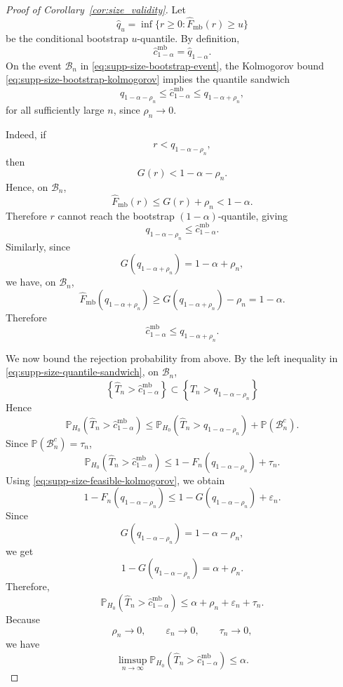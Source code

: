 \documentclass[
  12pt]{article}
\theoremstyle{plain}
\theoremstyle{definition}
\theoremstyle{remark}
\begin{document}
\begin{proof}[Proof of Corollary~\ref{cor:size_validity}]
Let
\[
\widehat q_u
=
\inf\{r\ge0:\widehat F_{\mathrm{mb}}(r)\ge u\}
\]
be the conditional bootstrap \(u\)-quantile. By definition,
\[
\widehat c_{1-\alpha}^{\mathrm{mb}}
=
\widehat q_{1-\alpha}.
\]
On the event \(\mathcal B_n\) in \eqref{eq:supp-size-bootstrap-event}, the
Kolmogorov bound \eqref{eq:supp-size-bootstrap-kolmogorov} implies the
quantile sandwich
\begin{equation}
\label{eq:supp-size-quantile-sandwich}
q_{1-\alpha-\rho_n}
\le
\widehat c_{1-\alpha}^{\mathrm{mb}}
\le
q_{1-\alpha+\rho_n},
\end{equation}
for all sufficiently large \(n\), since \(\rho_n\to0\).

Indeed, if
\[
r<q_{1-\alpha-\rho_n},
\]
then
\[
G(r)<1-\alpha-\rho_n.
\]
Hence, on \(\mathcal B_n\),
\[
\widehat F_{\mathrm{mb}}(r)
\le
G(r)+\rho_n
<
1-\alpha.
\]
Therefore \(r\) cannot reach the bootstrap \((1-\alpha)\)-quantile, giving
\[
q_{1-\alpha-\rho_n}
\le
\widehat c_{1-\alpha}^{\mathrm{mb}}.
\]
Similarly, since
\[
G(q_{1-\alpha+\rho_n})
=
1-\alpha+\rho_n,
\]
we have, on \(\mathcal B_n\),
\[
\widehat F_{\mathrm{mb}}(q_{1-\alpha+\rho_n})
\ge
G(q_{1-\alpha+\rho_n})-\rho_n
=
1-\alpha.
\]
Therefore
\[
\widehat c_{1-\alpha}^{\mathrm{mb}}
\le
q_{1-\alpha+\rho_n}.
\]

We now bound the rejection probability from above.  By the left inequality in
\eqref{eq:supp-size-quantile-sandwich}, on \(\mathcal B_n\),
\[
\left\{
\widehat T_n>\widehat c_{1-\alpha}^{\mathrm{mb}}
\right\}
\subset
\left\{
\widehat T_n>q_{1-\alpha-\rho_n}
\right\}
\]
Hence
\[
\mathbb P_{H_0}
\left(
\widehat T_n>\widehat c_{1-\alpha}^{\mathrm{mb}}
\right)
\le
\mathbb P_{H_0}
\left(
\widehat T_n>q_{1-\alpha-\rho_n}
\right)
+
\mathbb P(\mathcal B_n^c).
\]
Since \(\mathbb P(\mathcal B_n^c)=\tau_n\),
\[
\mathbb P_{H_0}
\left(
\widehat T_n>\widehat c_{1-\alpha}^{\mathrm{mb}}
\right)
\le
1-F_n(q_{1-\alpha-\rho_n})
+
\tau_n.
\]
Using \eqref{eq:supp-size-feasible-kolmogorov}, we obtain
\[
1-F_n(q_{1-\alpha-\rho_n})
\le
1-G(q_{1-\alpha-\rho_n})
+
\varepsilon_n.
\]
Since
\[
G(q_{1-\alpha-\rho_n})
=
1-\alpha-\rho_n,
\]
we get
\[
1-G(q_{1-\alpha-\rho_n})
=
\alpha+\rho_n.
\]
Therefore,
\begin{equation}
\label{eq:supp-size-upper-bound}
\mathbb P_{H_0}
\left(
\widehat T_n>\widehat c_{1-\alpha}^{\mathrm{mb}}
\right)
\le
\alpha+\rho_n+\varepsilon_n+\tau_n.
\end{equation}
Because
\[
\rho_n\to0,
\qquad
\varepsilon_n\to0,
\qquad
\tau_n\to0,
\]
we have
\[
\limsup_{n\to\infty}
\mathbb P_{H_0}
\left(
\widehat T_n>\widehat c_{1-\alpha}^{\mathrm{mb}}
\right)
\le
\alpha.
\]


\end{proof}
\end{document}
